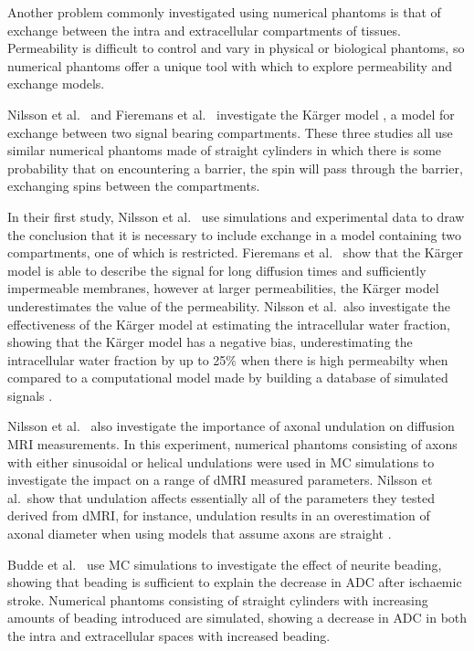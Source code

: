 Another problem commonly investigated using numerical phantoms is that of exchange between the intra and extracellular compartments of tissues.
Permeability is difficult to control and vary in physical or biological phantoms, so numerical phantoms offer a unique tool with which to explore permeability and exchange models.

Nilsson et al.\ \cite{Nilsson2009, Nilsson2010} and Fieremans et al.\ \cite{Fieremans2010} investigate the K\"arger model \cite{KARGER1988}, a model for exchange between two signal bearing compartments.
These three studies all use similar numerical phantoms made of straight cylinders in which there is some probability that on encountering a barrier, the spin will pass through the barrier, exchanging spins between the compartments.

In their first study, Nilsson et al.\ \cite{Nilsson2009} use simulations and experimental data to draw the conclusion that it is necessary to include exchange in a model containing two compartments, one of which is restricted. 
Fieremans et al.\ \cite{Fieremans2010} show that the K\"arger model is able to describe the signal for long diffusion times and sufficiently impermeable membranes, however at larger permeabilities, the K\"arger model underestimates the value of the permeability.
Nilsson et al.\ also investigate the effectiveness of the K\"arger model at estimating the intracellular water fraction, showing that the K\"arger model has a negative bias, underestimating the intracellular water fraction by up to 25\% when there is high permeabilty when compared to a computational model made by building a database of simulated signals \cite{Nilsson2010}.

Nilsson et al.\ \cite{Nilsson2012} also investigate the importance of axonal undulation on diffusion MRI measurements.
In this experiment, numerical phantoms consisting of axons with either sinusoidal or helical undulations were used in \ac{MC} simulations to investigate the impact on a range of \ac{dMRI} measured parameters.
Nilsson et al.\ show that undulation affects essentially all of the parameters they tested derived from \ac{dMRI}, for instance, undulation results in an overestimation of axonal diameter when using models that assume axons are straight \cite{Nilsson2012}. 

Budde et al.\ \cite{Budde2010} use \ac{MC} simulations to investigate the effect of neurite beading, showing that beading is sufficient to explain the decrease in \ac{ADC} after ischaemic stroke. Numerical phantoms consisting of straight cylinders with increasing amounts of beading introduced are simulated, showing a decrease in \ac{ADC} in both the intra and extracellular spaces with increased beading. 

